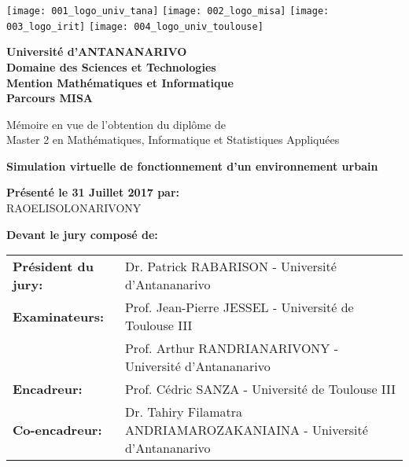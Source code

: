 \sloppy


\begin{titlepage}
	\begin{center}
	  \texttt{[image: 001\_logo\_univ\_tana]}\hspace*{4em}
	  \texttt{[image: 002\_logo\_misa]}\hspace*{4em}
	  \texttt{[image: 003\_logo\_irit]}\hspace*{4em}
	  \texttt{[image: 004\_logo\_univ\_toulouse]}
	\end{center}
	\vspace*{2em}
	
	\begin{center}
		\textbf{Université d'ANTANANARIVO} \\	
		\textbf{Domaine des Sciences et Technologies} \\
		\textbf{Mention Mathématiques et Informatique} \\	
		\textbf{Parcours MISA} \\
		\vspace*{3em}
		
		Mémoire en vue de l'obtention du diplôme de \\ 
		Master 2 en Mathématiques, Informatique et Statistiques Appliquées 
		\vspace*{3em}
		
		\begin{Large}
			\textbf{Simulation virtuelle de fonctionnement d'un environnement urbain}
		\end{Large}
		\vspace*{2em}
		
		\textbf{Présenté le 31 Juillet 2017 par:} \\
		RAOELISOLONARIVONY
		\vspace*{2em}
		
		\textbf{Devant le jury composé de:}\\
		\vspace*{2em}
		\begin{tabular}{l l}
			\textbf{Président du jury:}	&	Dr. Patrick RABARISON - Université d'Antananarivo \\
			\textbf{Examinateurs:}		&	Prof. Jean-Pierre JESSEL - Université de Toulouse III \\
										&	Prof. Arthur RANDRIANARIVONY - Université d'Antananarivo \\
			\textbf{Encadreur:}			& 	Prof. Cédric SANZA	- Université de Toulouse III \\
			\textbf{Co-encadreur:}		& 	Dr. Tahiry Filamatra ANDRIAMAROZAKANIAINA - Université d'Antananarivo \\
		\end{tabular}
	\end{center}
\end{titlepage}

\restoregeometry  
